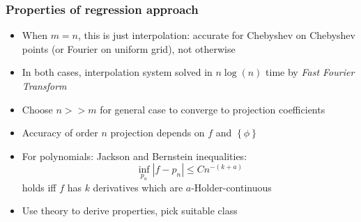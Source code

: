 \documentclass[bigger]{beamer}
\begin{document}
\begin{frame}%

\frametitle{Properties of regression approach}

\begin{itemize}

\item When $m=n$, this is just interpolation: \newline
accurate for Chebyshev on Chebyshev points (or Fourier on uniform grid), not otherwise
\item In both cases, interpolation system solved in $n\log(n)$ time by \emph{Fast Fourier Transform}

\item Choose $n>>m$ for general case to converge to projection coefficients

\item Accuracy of order $n$ projection depends on $f$ and $\left\{\phi\right\}$
\item For polynomials: Jackson and Bernstein inequalities: 
\begin{equation*}
\underset{p_n}{\inf}\left\vert f-p_n \right\vert \leq Cn^{-(k+a)}
\end{equation*}
holds iff $f$ has $k$ derivatives which are $a$-Holder-continuous
\item Use theory to derive properties, pick suitable class

\end{itemize}

\end{frame}%
\end{document}
